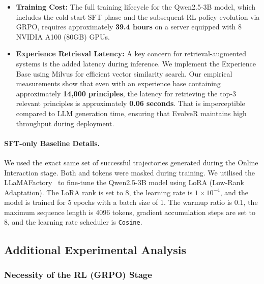 \begin{itemize}[leftmargin=2em]
    \item \textbf{Training Cost:} The full training lifecycle for the Qwen2.5-3B model, which includes the cold-start SFT phase and the subsequent RL policy evolution via GRPO, requires approximately \textbf{39.4 hours} on a server equipped with 8 NVIDIA A100 (80GB) GPUs. 
    
    \item \textbf{Experience Retrieval Latency:} A key concern for retrieval-augmented systems is the added latency during inference. We implement the Experience Base using Milvus for efficient vector similarity search. Our empirical measurements show that even with an experience base containing approximately \textbf{14,000 principles}, the latency for retrieving the top-3 relevant principles is approximately \textbf{0.06 seconds}. That is imperceptible compared to LLM generation time, ensuring that EvolveR maintains high throughput during deployment.
\end{itemize}



\paragraph{SFT-only Baseline Details.}
We used the exact same set of successful trajectories generated during the Online Interaction stage. Both  and  tokens were masked during training. We utilised the LLaMAFactory~\cite{zheng2024llamafactory} to fine-tune the Qwen2.5-3B model using LoRA (Low-Rank Adaptation). The LoRA rank is set to 8, the learning rate is $1\times10^{-4}$, and the model is trained for 5 epochs with a batch size of 1. The warmup ratio is 0.1, the maximum sequence length is 4096 tokens, gradient accumulation steps are set to 8, and the learning rate scheduler is \texttt{Cosine}.

\subsection{Additional Experimental Analysis}
\label{sec:additional_exp_analysis}

\subsubsection{Necessity of the RL (GRPO) Stage}

